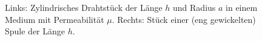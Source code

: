 \begin{figure}[htb]
	\centering
	\tfigcylindricalConductorAndCoil
	\caption{Links: Zylindrisches Drahtstück der Länge $h$ und Radius $a$ in einem Medium mit Permeabilität $\mu$. Rechts: Stück einer (eng gewickelten) Spule der Länge $h$. }
	\label{fig:cylindricalConductorAndCoil}
\end{figure}